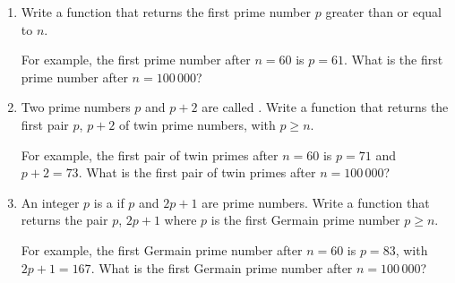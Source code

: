 \documentclass[11pt,class=report,crop=false]{standalone}
\begin{document}
\begin{activite}


\begin{enumerate}
  \item Write a function  that returns the first prime number $p$ greater than or equal to $n$. 
  
  For example, the first prime number after $n=60$ is $p=61$. 
  What is the first prime number after $n=100\,000$?
  
  \item Two prime numbers $p$ and $p+2$ are called . Write a function  that returns the first pair $p$, $p+2$ of twin prime numbers, with $p \ge n$.
  
  For example, the first pair of twin primes after $n=60$ is $p=71$ and $p+2=73$.   
  What is the first pair of twin primes after $n=100\,000$?
    
  \item An integer $p$ is a  if $p$ and $2p+1$ are prime numbers. Write a function  that returns the pair $p$, $2p+1$ where $p$ is the first Germain prime number $p \ge n$.
  
  For example, the first Germain prime number after $n=60$ is $p=83$, with $2p+1=167$.   
  What is the first Germain prime number after $n=100\,000$?
  
\end{enumerate}   
     
\end{activite}
\end{document}
